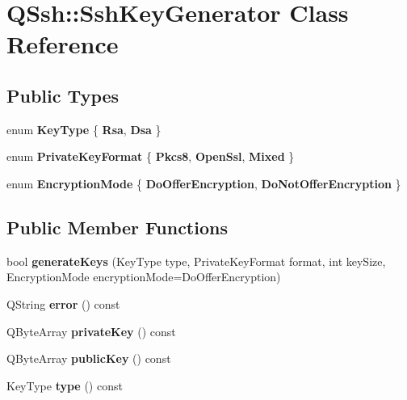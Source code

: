 \hypertarget{class_q_ssh_1_1_ssh_key_generator}{}\section{Q\+Ssh\+:\+:Ssh\+Key\+Generator Class Reference}
\label{class_q_ssh_1_1_ssh_key_generator}
\subsection*{Public Types}
\begin{DoxyCompactItemize}
\item 
\mbox{\label{class_q_ssh_1_1_ssh_key_generator_a7aeb2eb9df1dd829873f139f37237102}} 
enum {\bfseries Key\+Type} \{ {\bfseries Rsa}, 
{\bfseries Dsa}
 \}
\item 
\mbox{\label{class_q_ssh_1_1_ssh_key_generator_a3091a56528a0a733f6ab4f82a49b3003}} 
enum {\bfseries Private\+Key\+Format} \{ {\bfseries Pkcs8}, 
{\bfseries Open\+Ssl}, 
{\bfseries Mixed}
 \}
\item 
\mbox{\label{class_q_ssh_1_1_ssh_key_generator_a22784cf5209d4e885b1bb394d71c2507}} 
enum {\bfseries Encryption\+Mode} \{ {\bfseries Do\+Offer\+Encryption}, 
{\bfseries Do\+Not\+Offer\+Encryption}
 \}
\end{DoxyCompactItemize}
\subsection*{Public Member Functions}
\begin{DoxyCompactItemize}
\item 
\mbox{\label{class_q_ssh_1_1_ssh_key_generator_a4333abe9d0daa28cff94ed2546b754cf}} 
bool {\bfseries generate\+Keys} (Key\+Type type, Private\+Key\+Format format, int key\+Size, Encryption\+Mode encryption\+Mode=Do\+Offer\+Encryption)
\item 
\mbox{\label{class_q_ssh_1_1_ssh_key_generator_a10ca503d92729b40cc53ac41073e733b}} 
Q\+String {\bfseries error} () const
\item 
\mbox{\label{class_q_ssh_1_1_ssh_key_generator_a5e8baee554710620c049f32e2f0987b5}} 
Q\+Byte\+Array {\bfseries private\+Key} () const
\item 
\mbox{\label{class_q_ssh_1_1_ssh_key_generator_aa9422f0216641a982d526976782c97b0}} 
Q\+Byte\+Array {\bfseries public\+Key} () const
\item 
\mbox{\label{class_q_ssh_1_1_ssh_key_generator_a24df4b7d356e740df292d0ab45d322ec}} 
Key\+Type {\bfseries type} () const
\end{DoxyCompactItemize}



